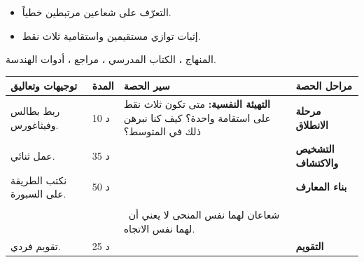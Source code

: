 \documentclass[12pt,a4paper]{article}
\newenvironment{LTR}{\begin{otherlanguage}{english}}{\end{otherlanguage}}
\newcommand{\ar}[1]{\foreignlanguage{arabic}{#1}}
\newcommand{\Phase}[1]{\textbf{#1}}
\newenvironment{Sayr}{%
\begin{LTR}\renewcommand{\arraystretch}{1.25}
\begin{longtable}{|p{0.17\textwidth}|>{\centering\arraybackslash}p{0.06\textwidth}|p{0.53\textwidth}|>{\centering\arraybackslash}p{0.12\textwidth}|}
\hline\rowcolor{cThm!12}\ar{\textbf{توجيهات وتعاليق}} & \ar{\textbf{المدة}} & \ar{\textbf{سير الحصة}} & \ar{\textbf{مراحل الحصة}}\\\hline\endhead
\hline\endfoot}{\end{longtable}\end{LTR}}
\newcommand{\Row}[4]{\ar{\small #4} & \ar{#3} & \ar{#2} & \cellcolor{cThm!8}\ar{\Phase{#1}}\\\hline}
\newcommand{\Lab}[2]{\foreignlanguage{english}{\tcbox[on line,colback=#1,colframe=#1,boxrule=0pt,arc=2pt,boxsep=1pt,left=5pt,right=5pt,top=1pt,bottom=1pt]{\ar{\textcolor{white}{\textbf{#2}}}}}}
\newcommand{\ck}{\ensuremath{{\color{cRem}\checkmark}}}
\begin{document}
{\begin{itemize}\item التعرّف على شعاعين مرتبطين خطياً.\item إثبات توازي مستقيمين واستقامية ثلاث نقط.\end{itemize}}%
{المنهاج ، الكتاب المدرسي ، مراجع ، أدوات الهندسة.}
\begin{Sayr}
\Row{مرحلة الانطلاق}{%
\textbf{التهيئة النفسية:} متى تكون ثلاث نقط على استقامة واحدة؟ كيف كنا نبرهن ذلك في المتوسط؟}{10 د}{ربط بطالس وفيثاغورس.}
\Row{التشخيص والاكتشاف}{%
\Lab{cEx}{مناقشة نشاط 04 صفحة 253}\par\ck\ إذا كان $\overrightarrow{AC}=k\overrightarrow{AB}$ فإن الشعاعين لهما نفس المنحى ، والمستقيمان $(AB)$ و $(AC)$ متوازيان ويشتركان في $A$: النقط $A$ ، $B$ ، $C$ على استقامة واحدة.\par
}{35 د}{عمل ثنائي.}
\Row{بناء المعارف}{%
\Lab{cDef}{تعريف}\ نقول إن $\vec u$ و $\vec v$ \textbf{مرتبطان خطياً} إذا وُجد عدد حقيقي $k$ حيث $\vec v=k\vec u$ (أو $\vec u=\vec0$).\par\Lab{cThm}{خاصية}\par\ck\ $(AB)\parallel(CD)\iff\overrightarrow{AB}$ و $\overrightarrow{CD}$ مرتبطان خطياً.\par
\ck\ $A$ ، $B$ ، $C$ على استقامة واحدة $\iff\overrightarrow{AB}$ و $\overrightarrow{AC}$ مرتبطان خطياً.\par
}{50 د}{نكتب الطريقة على السبورة.}
\Row{}{%
\Lab{cEx}{مثال}\ $ABC$ مثلث ، $\overrightarrow{AE}=3\overrightarrow{AB}$ و $\overrightarrow{AF}=3\overrightarrow{AC}$: \ $\overrightarrow{EF}=\overrightarrow{AF}-\overrightarrow{AE}=3(\overrightarrow{AC}-\overrightarrow{AB})=3\overrightarrow{BC}$ ، إذن $(EF)\parallel(BC)$.\par\Lab{cMeth}{طريقة}\ نعبّر عن الشعاعين بدلالة شعاعين مرجعيين (باستعمال شال) ثم نقارن.\par}{}{}
\Row{}{%
\Lab{cThm!80!black}{حذار}\ شعاعان لهما نفس المنحى لا يعني أن لهما نفس الاتجاه.}{}{}
\Row{التقويم}{%
\Lab{cEx}{تطبيق}\par $ABC$ مثلث ، $M$ و $N$ حيث $\overrightarrow{AM}=\dfrac13\overrightarrow{AB}$ و $\overrightarrow{AN}=\dfrac13\overrightarrow{AC}$. بيّن أن $(MN)\parallel(BC)$.\par\textbf{الحل:} $\overrightarrow{MN}=\overrightarrow{AN}-\overrightarrow{AM}=\dfrac13\overrightarrow{BC}$.\par\textbf{واجب منزلي:} تمارين من الكتاب المدرسي.\par\smallskip\textbf{ملاحظات حول سير الحصة:} \dotfill}{25 د}{تقويم فردي.}
\end{Sayr}
\end{document}
